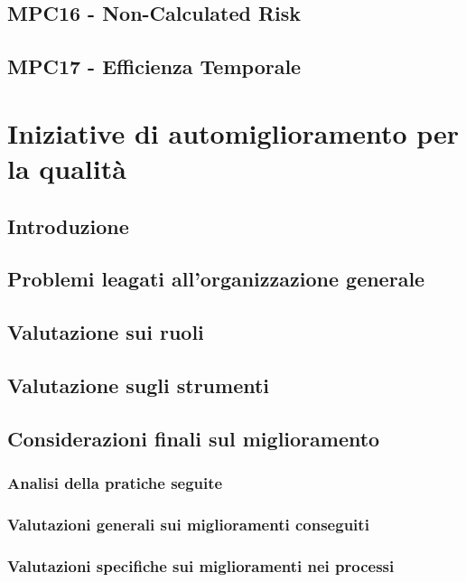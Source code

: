\documentclass[italian,12pt]{article} %
\begin{document}
\subsection{MPC16 - Non-Calculated Risk}

\subsection{MPC17 - Efficienza Temporale}

\section{Iniziative di automiglioramento per la qualità}

\subsection{Introduzione}

\subsection{Problemi leagati all’organizzazione generale}

\subsection{Valutazione sui ruoli}

\subsection*{Valutazione sugli strumenti}

\subsection{Considerazioni finali sul miglioramento}

\subsubsection{Analisi della pratiche seguite}

\subsubsection{Valutazioni generali sui miglioramenti conseguiti}

\subsubsection{Valutazioni specifiche sui miglioramenti nei processi}


\end{document}
